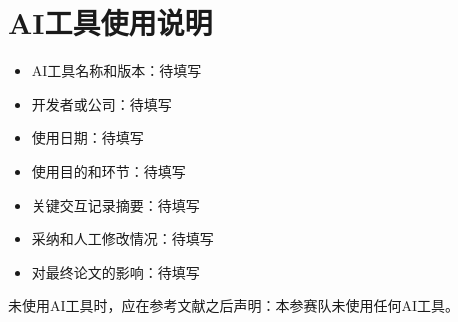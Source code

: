 \section*{AI工具使用说明}

\begin{itemize}
  \item AI工具名称和版本：待填写
  \item 开发者或公司：待填写
  \item 使用日期：待填写
  \item 使用目的和环节：待填写
  \item 关键交互记录摘要：待填写
  \item 采纳和人工修改情况：待填写
  \item 对最终论文的影响：待填写
\end{itemize}

未使用AI工具时，应在参考文献之后声明：本参赛队未使用任何AI工具。
